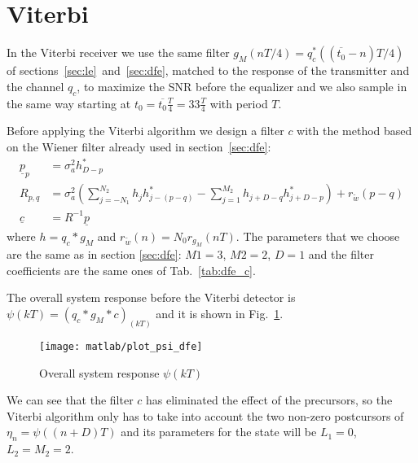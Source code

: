 \documentclass[a4paper,oneside]{article}
\renewcommand{\vec}[1]{\underline{#1}}
\begin{document}
\section{Viterbi}
\label{sec:viterbi}
In the Viterbi receiver we use the same filter $g_M(nT/4) = q_c^*((\overline{t_0} - n)T/4)$ of
sections~\ref{sec:le}~and~\ref{sec:dfe}, matched to the response of
the transmitter and the channel $q_c$, to maximize the
  SNR before the equalizer and we also sample in the same way
starting at $t_0 = \overline{t_0}\frac{T}{4} = 33\frac{T}{4}$ with
period $T$.

Before applying the Viterbi algorithm we design a filter $c$ with the
method based on the Wiener filter already used in
section~\ref{sec:dfe}:
\begin{align}
  \vec{p}_p &= \sigma^2_ah^*_{D-p} \\
  R_{p,q} &= \sigma^2_a\left( \sum_{j=-N_1}^{N_2}h_jh^*_{j-(p-q)} - \sum_{j=1}^{M_2}h_{j+D-q}h^*_{j+D-p} \right) + r_{\tilde{w}}(p-q) \\
    \vec{c} &= R^{-1} \vec{p}
\end{align}
where $h = q_c * g_M$ and $r_{\tilde{w}}(n) = N_0 r_{g_M}(nT)$. The
parameters that we choose are the same as in section \ref{sec:dfe}:
$M1 = 3$, $M2 = 2$, $D=1$ and the filter coefficients are the same ones of
Tab.~\ref{tab:dfe_c}.

The overall system response before the Viterbi detector is $\psi(kT) =
(q_c * g_M * c)_{(kT)}$ and it is shown in Fig.~\ref{plot:psi_dfe}.
\begin{figure}[htbp]
  \centering
  \texttt{[image: matlab/plot\_psi\_dfe]}
  \caption{Overall system response $\psi(kT)$}
  \label{plot:psi_dfe}
\end{figure}
We can see that the filter $c$ has eliminated the effect of the
precursors, so the Viterbi algorithm only has to take into account the
two non-zero postcursors of $\eta_n = \psi((n+D)T)$ and its parameters
for the state will be $L_1 = 0$, $L_2 = M_2 = 2$.
\end{document}
